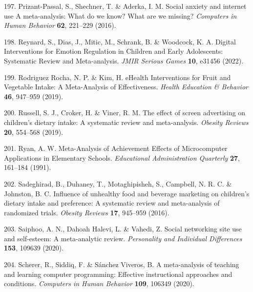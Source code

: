 \documentclass[
  english,
  man]{apa6}
\newenvironment{cslreferences}%
  {}%
  {\par}
\begin{document}
\begin{cslreferences}
\leavevmode\hypertarget{ref-prizant-passalSocialAnxietyInternet2016}{}%
197. Prizant-Passal, S., Shechner, T. \& Aderka, I. M. Social anxiety and internet use A meta-analysis: What do we know? What are we missing? \emph{Computers in Human Behavior} \textbf{62}, 221--229 (2016).

\leavevmode\hypertarget{ref-reynardDigitalInterventionsEmotion2022}{}%
198. Reynard, S., Dias, J., Mitic, M., Schrank, B. \& Woodcock, K. A. Digital Interventions for Emotion Regulation in Children and Early Adolescents: Systematic Review and Meta-analysis. \emph{JMIR Serious Games} \textbf{10}, e31456 (2022).

\leavevmode\hypertarget{ref-rodriguezrochaEHealthInterventionsFruit2019}{}%
199. Rodriguez Rocha, N. P. \& Kim, H. eHealth Interventions for Fruit and Vegetable Intake: A Meta-Analysis of Effectiveness. \emph{Health Education \& Behavior} \textbf{46}, 947--959 (2019).

\leavevmode\hypertarget{ref-russellEffectScreenAdvertising2019}{}%
200. Russell, S. J., Croker, H. \& Viner, R. M. The effect of screen advertising on children's dietary intake: A systematic review and meta-analysis. \emph{Obesity Reviews} \textbf{20}, 554--568 (2019).

\leavevmode\hypertarget{ref-ryanMetaAnalysisAchievementEffects1991}{}%
201. Ryan, A. W. Meta-Analysis of Achievement Effects of Microcomputer Applications in Elementary Schools. \emph{Educational Administration Quarterly} \textbf{27}, 161--184 (1991).

\leavevmode\hypertarget{ref-sadeghiradInfluenceUnhealthyFood2016}{}%
202. Sadeghirad, B., Duhaney, T., Motaghipisheh, S., Campbell, N. R. C. \& Johnston, B. C. Influence of unhealthy food and beverage marketing on children's dietary intake and preference: A systematic review and meta-analysis of randomized trials. \emph{Obesity Reviews} \textbf{17}, 945--959 (2016).

\leavevmode\hypertarget{ref-saiphooSocialNetworkingSite2020}{}%
203. Saiphoo, A. N., Dahoah Halevi, L. \& Vahedi, Z. Social networking site use and self-esteem: A meta-analytic review. \emph{Personality and Individual Differences} \textbf{153}, 109639 (2020).

\leavevmode\hypertarget{ref-schererMetaanalysisTeachingLearning2020}{}%
204. Scherer, R., Siddiq, F. \& Sánchez Viveros, B. A meta-analysis of teaching and learning computer programming: Effective instructional approaches and conditions. \emph{Computers in Human Behavior} \textbf{109}, 106349 (2020).


\end{cslreferences}
\end{document}
